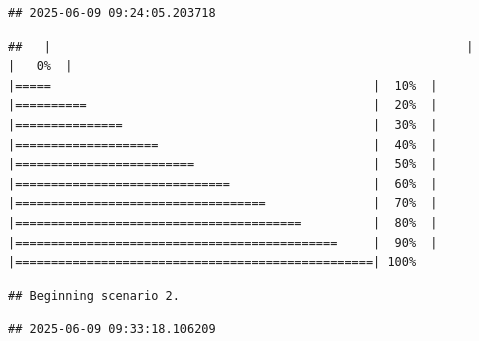 \documentclass[
]{article}
\begin{document}
\begin{verbatim}
## 2025-06-09 09:24:05.203718
\end{verbatim}

\begin{verbatim}
##   |                                                          |                                                  |   0%  |                                                          |=====                                             |  10%  |                                                          |==========                                        |  20%  |                                                          |===============                                   |  30%  |                                                          |====================                              |  40%  |                                                          |=========================                         |  50%  |                                                          |==============================                    |  60%  |                                                          |===================================               |  70%  |                                                          |========================================          |  80%  |                                                          |=============================================     |  90%  |                                                          |==================================================| 100%
\end{verbatim}

\begin{verbatim}
## Beginning scenario 2.
\end{verbatim}

\begin{verbatim}
## 2025-06-09 09:33:18.106209
\end{verbatim}
\end{document}
